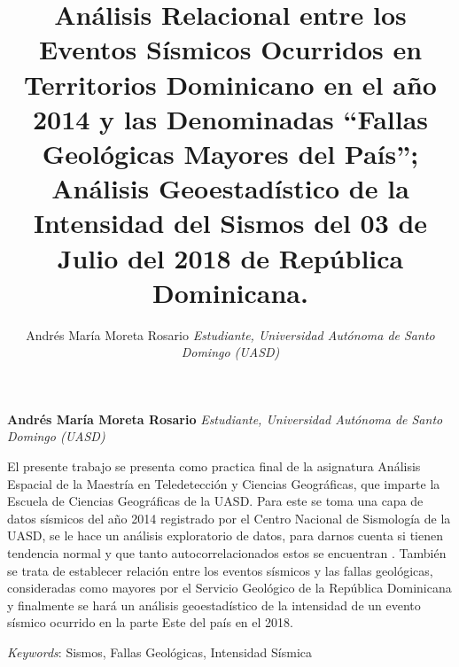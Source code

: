 \documentclass[11pt,]{article}
\title{Análisis Relacional entre los Eventos Sísmicos Ocurridos en Territorios
Dominicano en el año 2014 y las Denominadas ``Fallas Geológicas Mayores
del País''; Análisis Geoestadístico de la Intensidad del Sismos del 03
de Julio del 2018 de República Dominicana.  }
\author{\Large Andrés María Moreta Rosario\vspace{0.05in} \newline\normalsize\emph{Estudiante, Universidad Autónoma de Santo Domingo (UASD)}  }
\date{}
\newcommand*{\authorfont}{\fontfamily{phv}\selectfont}
\renewenvironment{abstract}
 {{%
    \setlength{\leftmargin}{0mm}
    \setlength{\rightmargin}{\leftmargin}%
  }%
  \relax}
 {\endlist}
\begin{document}
	
%

{%
\setlength{\parindent}{0pt}
\thispagestyle{plain}
{\fontsize{18}{20}\selectfont\raggedright 
\maketitle  %

}

{
   \vskip 13.5pt\relax \normalsize\fontsize{11}{12} 
\textbf{\authorfont Andrés María Moreta Rosario} \hskip 15pt \emph{\small Estudiante, Universidad Autónoma de Santo Domingo (UASD)}   

}

}








\begin{abstract}

    \hbox{\vrule height .2pt width 39.14pc}

    \vskip 8.5pt %

\noindent El presente trabajo se presenta como practica final de la asignatura
Análisis Espacial de la Maestría en Teledetección y Ciencias
Geográficas, que imparte la Escuela de Ciencias Geográficas de la UASD.
Para este se toma una capa de datos sísmicos del año 2014 registrado por
el Centro Nacional de Sismología de la UASD, se le hace un análisis
exploratorio de datos, para darnos cuenta si tienen tendencia normal y
que tanto autocorrelacionados estos se encuentran . También se trata de
establecer relación entre los eventos sísmicos y las fallas geológicas,
consideradas como mayores por el Servicio Geológico de la República
Dominicana y finalmente se hará un análisis geoestadístico de la
intensidad de un evento sísmico ocurrido en la parte Este del país en el
2018.


\vskip 8.5pt \noindent \emph{Keywords}: Sismos, Fallas Geológicas, Intensidad Sísmica \par

    \hbox{\vrule height .2pt width 39.14pc}



\end{abstract}
\end{document}
